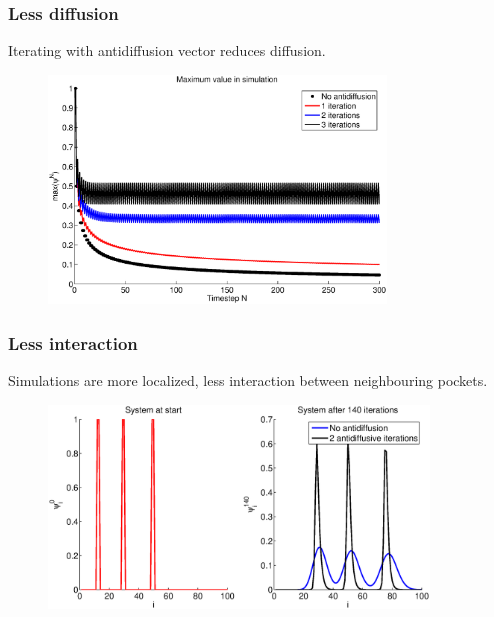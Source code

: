 \documentclass[hyperref={pdfstartview=Fit}]{beamer}
\newcommand{\imsize}{}
\begin{document}
\begin{frame}

\frametitle{Less diffusion}
Iterating with antidiffusion vector reduces diffusion.

\begin{figure}
\renewcommand{\imsize}{0.8\textwidth}
\includegraphics[width=\imsize]{maxs}%
\end{figure}
\end{frame}

\begin{frame}

\frametitle{Less interaction}
Simulations are more localized, less interaction between neighbouring pockets.

\begin{figure}
\renewcommand{\imsize}{0.9\textwidth}
\includegraphics[width=\imsize]{animation/peaks}%
\end{figure}
\end{frame}
\end{document}
